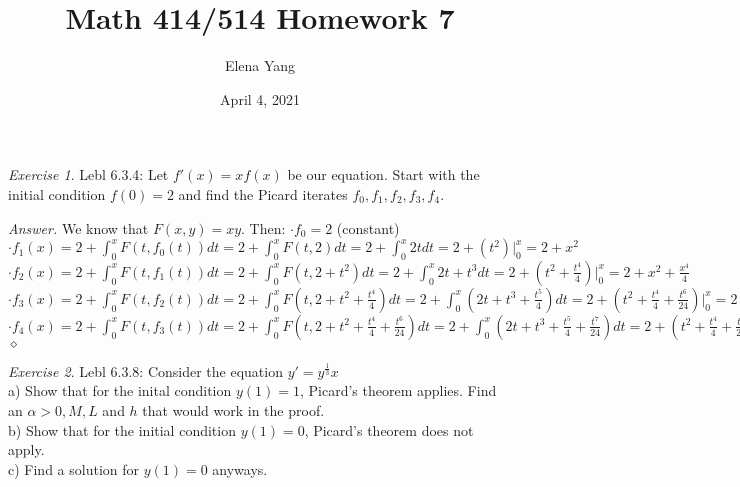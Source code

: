 \documentclass[12pt,oneside]{amsart}
\title{Math 414/514 Homework 7}
\author{Elena Yang}
\date{April 4, 2021}
\theoremstyle{definition}
\theoremstyle{remark}
\newtheorem{exer}{Exercise}
\numberwithin{equation}{exer}
\newenvironment{answer}{\bigskip\noindent\emph{Answer.}}{\hfill$\diamond$\newline}
\begin{document}
\maketitle
\begin{exer}
Lebl 6.3.4: Let $f'(x)=xf(x)$ be our equation. Start with the initial condition $f(0)=2$ and find the Picard iterates $f_0,f_1,f_2,f_3,f_4$. 
\end{exer}
\begin{answer} 
We know that $F(x,y)=xy$. Then: $\cdot f_0=\boxed{2}$ (constant) \\
$\cdot f_1(x)= 2+\int_{0}^{x}F(t,f_0(t))dt=2+\int_{0}^{x}F(t,2)dt=2+\int_{0}^{x}2tdt=2+(t^2)|_{0}^{x}=\boxed{2+x^2}$ \\
$\cdot f_2(x)= 2+\int_{0}^{x}F(t,f_1(t))dt=2+\int_{0}^{x}F(t,2+t^2)dt=2+\int_{0}^{x}2t+t^3dt=2+(t^2+\frac{t^4}{4})|_{0}^{x}=\boxed{2+x^2+\frac{x^4}{4}}$ \\
$\cdot f_3(x)= 2+\int_{0}^{x}F(t,f_2(t))dt=2+\int_{0}^{x}F(t,2+t^2+\frac{t^4}{4})dt=2+\int_{0}^{x}(2t+t^3+\frac{t^5}{4})dt=2+(t^2+\frac{t^4}{4}+\frac{t^6}{24})|_{0}^{x}=\boxed{2+x^2+\frac{x^4}{4}+\frac{x^6}{24}}$ \\
$\cdot f_4(x)= 2+\int_{0}^{x}F(t,f_3(t))dt=2+\int_{0}^{x}F(t,2+t^2+\frac{t^4}{4}+\frac{t^6}{24})dt=2+\int_{0}^{x}(2t+t^3+\frac{t^5}{4}+\frac{t^7}{24})dt=2+(t^2+\frac{t^4}{4}+\frac{t^6}{24}+\frac{t^8}{192})|_{0}^{x}=\boxed{2+x^2+\frac{x^4}{4}+\frac{x^6}{24}+\frac{x^8}{192}}$
\end{answer}

\newpage
\begin{exer}
Lebl 6.3.8: Consider the equation $y'=y^{\frac{1}{3}}x$\\
a) Show that for the inital condition $y(1)=1$, Picard's theorem applies. Find an $\alpha>0, M, L$ and $h$ that would work in the proof. \\
b) Show that for the initial condition $y(1)=0$, Picard's theorem does not apply. \\
c) Find a solution for $y(1)=0$ anyways.
\end{exer}
\end{document}
